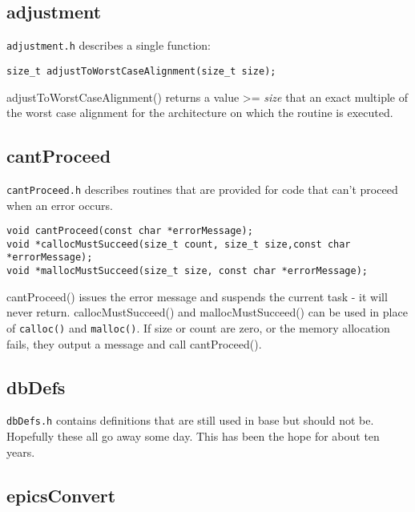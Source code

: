 \subsection{adjustment}

\verb|adjustment.h| describes a single function:

\begin{verbatim}
size_t adjustToWorstCaseAlignment(size_t size);
\end{verbatim}

adjustToWorstCaseAlignment() returns a value \textgreater{}= \emph{size} that an exact multiple of the worst case alignment for the architecture on which the routine is executed.

\subsection{cantProceed}

\verb|cantProceed.h| describes routines that are provided for code that can't proceed when an error occurs.

\begin{verbatim}
void cantProceed(const char *errorMessage);
void *callocMustSucceed(size_t count, size_t size,const char *errorMessage);
void *mallocMustSucceed(size_t size, const char *errorMessage);
\end{verbatim}

cantProceed() issues the error message and suspends the current task - it will never return. callocMustSucceed() and mallocMustSucceed() can be used in place of \verb|calloc()| and \verb|malloc()|.
If size or count are zero, or the memory allocation fails, they output a message and call cantProceed().

\subsection{dbDefs}

\verb|dbDefs.h| contains definitions that are still used in base but should not be.
Hopefully these all go away some day.
This has been the hope for about ten years.

\subsection{epicsConvert}

